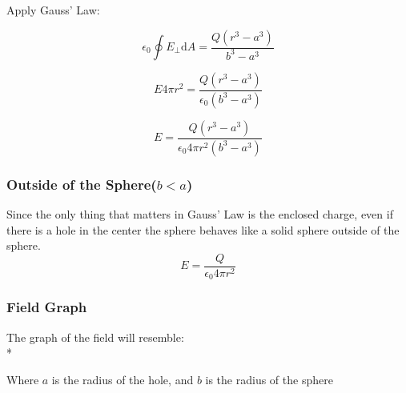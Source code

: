 \documentclass[a4paper,12pt]{article}
\begin{document}
						Apply Gauss' Law:

						\begin{equation*}
								\epsilon_{0} \oint E_{\bot} \mathrm{d}A = \frac{Q(r^{3} - a^{3})}{b^{3} - a^{3}}
						\end{equation*}
						
						\begin{equation*}
								E 4 \pi r^{2} = \frac{Q(r^{3} - a^{3})}{\epsilon_{0} (b^{3} - a^{3})}
						\end{equation*}

						\begin{equation*}
								E = \frac{Q(r^{3} - a^{3})}{\epsilon_{0} 4 \pi r^{2} (b^{3} - a^{3})}
						\end{equation*}
					\subsubsection{Outside of the Sphere($b < a$)}
						Since the only thing that matters in Gauss' Law is the enclosed charge, even if there is a hole in the center the sphere behaves like a solid sphere outside of the sphere.
						\begin{equation*}
								E = \frac{Q}{\epsilon_{0} 4 \pi r^{2}} 
						\end{equation*}

					\subsubsection{Field Graph}
					 The graph of the field will resemble:\\*

					 Where $a$ is the radius of the hole, and $b$ is the radius of the sphere

				\setcounter{subsubsection}{0}

\end{document}
